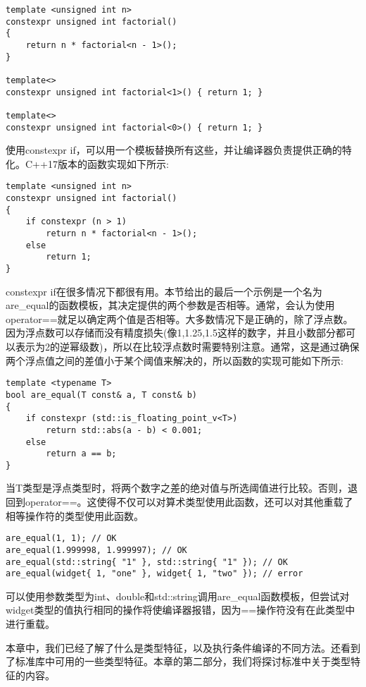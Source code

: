 \begin{lstlisting}[style=styleCXX]
template <unsigned int n>
constexpr unsigned int factorial()
{
	return n * factorial<n - 1>();
}

template<>
constexpr unsigned int factorial<1>() { return 1; }

template<>
constexpr unsigned int factorial<0>() { return 1; }
\end{lstlisting}

使用constexpr if，可以用一个模板替换所有这些，并让编译器负责提供正确的特化。C++17版本的函数实现如下所示:

\begin{lstlisting}[style=styleCXX]
template <unsigned int n>
constexpr unsigned int factorial()
{
	if constexpr (n > 1)
		return n * factorial<n - 1>();
	else
		return 1;
}
\end{lstlisting}

constexpr if在很多情况下都很有用。本节给出的最后一个示例是一个名为are\_equal的函数模板，其决定提供的两个参数是否相等。通常，会认为使用operator==就足以确定两个值是否相等。大多数情况下是正确的，除了浮点数。因为浮点数可以存储而没有精度损失(像1,1.25,1.5这样的数字，并且小数部分都可以表示为2的逆幂级数)，所以在比较浮点数时需要特别注意。通常，这是通过确保两个浮点值之间的差值小于某个阈值来解决的，所以函数的实现可能如下所示:

\begin{lstlisting}[style=styleCXX]
template <typename T>
bool are_equal(T const& a, T const& b)
{
	if constexpr (std::is_floating_point_v<T>)
		return std::abs(a - b) < 0.001;
	else
		return a == b;
}
\end{lstlisting}

当T类型是浮点类型时，将两个数字之差的绝对值与所选阈值进行比较。否则，退回到operator==。这使得不仅可以对算术类型使用此函数，还可以对其他重载了相等操作符的类型使用此函数。

\begin{lstlisting}[style=styleCXX]
are_equal(1, 1); // OK
are_equal(1.999998, 1.999997); // OK
are_equal(std::string{ "1" }, std::string{ "1" }); // OK
are_equal(widget{ 1, "one" }, widget{ 1, "two" }); // error
\end{lstlisting}

可以使用参数类型为int、double和std::string调用are\_equal函数模板，但尝试对widget类型的值执行相同的操作将使编译器报错，因为==操作符没有在此类型中进行重载。

本章中，我们已经了解了什么是类型特征，以及执行条件编译的不同方法。还看到了标准库中可用的一些类型特征。本章的第二部分，我们将探讨标准中关于类型特征的内容。






































